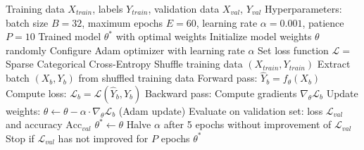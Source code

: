 \documentclass[a4paper,fleqn]{cas-sc}
\begin{document}
\begin{algorithm}[!htbp]
\caption{CovNet22 Model Training}
\label{alg:training}
\begin{algorithmic}[1]
\Require Training data $X_{train}$, labels $Y_{train}$, validation data $X_{val}$, $Y_{val}$
\Require Hyperparameters: batch size $B = 32$, maximum epochs $E = 60$, learning rate $\alpha = 0.001$, patience $P = 10$
\Ensure Trained model $\theta^*$ with optimal weights
\State Initialize model weights $\theta$ randomly
\State Configure Adam optimizer with learning rate $\alpha$
\State Set loss function $\mathcal{L} = $ Sparse Categorical Cross-Entropy
    \State Shuffle training data $(X_{train}, Y_{train})$
        \State Extract batch $(X_b, Y_b)$ from shuffled training data
        \State Forward pass: $\hat{Y}_b = f_\theta(X_b)$
        \State Compute loss: $\mathcal{L}_b = \mathcal{L}(\hat{Y}_b, Y_b)$
        \State Backward pass: Compute gradients $\nabla_\theta \mathcal{L}_b$
        \State Update weights: $\theta \leftarrow \theta - \alpha \cdot \nabla_\theta \mathcal{L}_b$ (Adam update)
    \EndFor
    \State Evaluate on validation set: loss $\mathcal{L}_{val}$ and accuracy $\text{Acc}_{val}$
        \State $\theta^* \leftarrow \theta$ 
    \EndIf
    \State Halve $\alpha$ after 5 epochs without improvement of $\mathcal{L}_{val}$
    \State Stop if $\mathcal{L}_{val}$ has not improved for $P$ epochs
\EndFor
\State \Return $\theta^*$ 
\end{algorithmic}
\end{algorithm}
\end{document}
